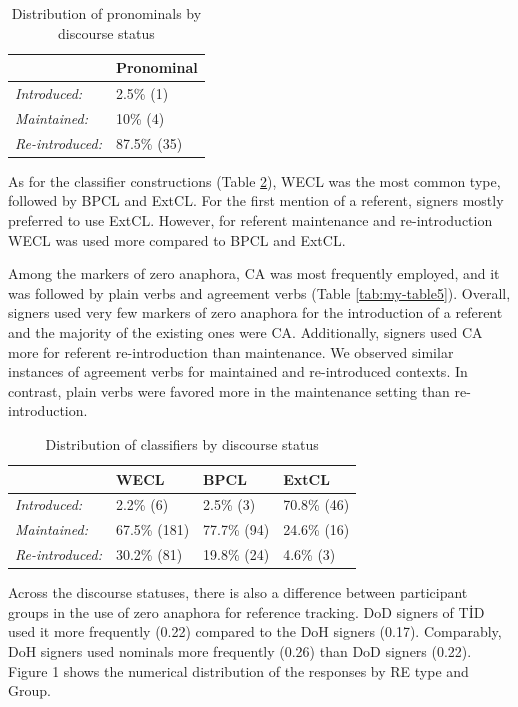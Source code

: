 \documentclass[]{elsarticle} %
\begin{document}
\begin{table}
\small
\caption{Distribution of pronominals by discourse status}
\label{tab:my-table3}
\begin{tabular}{ll}
\hline
                        & Pronominal  \\ \hline
\textit{Introduced:}    & 2.5\% (1)   \\
\textit{Maintained:}    & 10\% (4)    \\
\textit{Re-introduced:} & 87.5\% (35) \\ \hline
\end{tabular}
\end{table}

As for the classifier constructions (Table \ref{tab:my-table4}), WECL
was the most common type, followed by BPCL and ExtCL. For the first
mention of a referent, signers mostly preferred to use ExtCL. However,
for referent maintenance and re-introduction WECL was used more compared
to BPCL and ExtCL.

Among the markers of zero anaphora, CA was most frequently employed, and
it was followed by plain verbs and agreement verbs (Table
\ref{tab:my-table5}). Overall, signers used very few markers of zero
anaphora for the introduction of a referent and the majority of the
existing ones were CA. Additionally, signers used CA more for referent
re-introduction than maintenance. We observed similar instances of
agreement verbs for maintained and re-introduced contexts. In contrast,
plain verbs were favored more in the maintenance setting than
re-introduction.

\begin{table}
\small
\caption{Distribution of classifiers by discourse status}
\label{tab:my-table4}
\begin{tabular}{llll}
\hline
                        & WECL          & BPCL        & ExtCL         \\ \hline
\textit{Introduced:}    & 2.2\% (6)    & 2.5\% (3)   & 70.8\% (46) \\
\textit{Maintained:}    & 67.5\% (181) & 77.7\% (94) & 24.6\% (16) \\
\textit{Re-introduced:} & 30.2\% (81)   & 19.8\% (24)   & 4.6\% (3)   \\ \hline
\end{tabular}
\end{table}

Across the discourse statuses, there is also a difference between
participant groups in the use of zero anaphora for reference tracking.
DoD signers of TİD used it more frequently (0.22) compared to the DoH
signers (0.17). Comparably, DoH signers used nominals more frequently
(0.26) than DoD signers (0.22). Figure 1 shows the numerical
distribution of the responses by RE type and Group.
\end{document}
